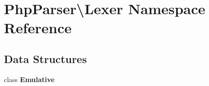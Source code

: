 \section{Php\+Parser\textbackslash{}Lexer Namespace Reference}
\label{namespace_php_parser_1_1_lexer}
\subsection*{Data Structures}
\begin{DoxyCompactItemize}
\item 
class {\bf Emulative}
\end{DoxyCompactItemize}
